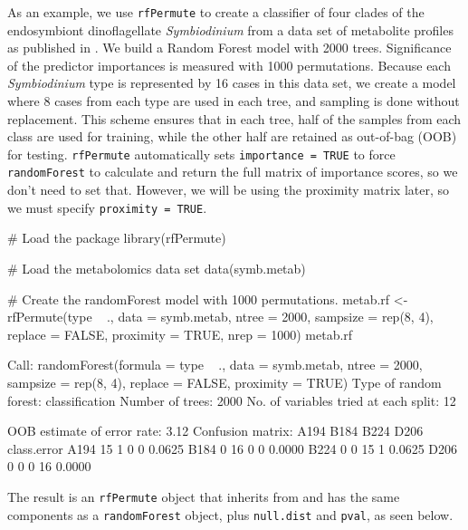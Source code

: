 As an example, we use \texttt{rfPermute} to create a classifier of four
clades of the endosymbiont dinoflagellate \emph{Symbiodinium} from a
data set of metabolite profiles as published in \citet{RN404}. We build
a Random Forest model with 2000 trees. Significance of the predictor
importances is measured with 1000 permutations. Because each
\emph{Symbiodinium} type is represented by 16 cases in this data set, we
create a model where 8 cases from each type are used in each tree, and
sampling is done without replacement. This scheme ensures that in each
tree, half of the samples from each class are used for training, while
the other half are retained as out-of-bag (OOB) for testing.
\texttt{rfPermute} automatically sets \texttt{importance\ =\ TRUE} to
force \texttt{randomForest} to calculate and return the full matrix of
importance scores, so we don't need to set that. However, we will be
using the proximity matrix later, so we must specify
\texttt{proximity\ =\ TRUE}.

\begin{Schunk}
\begin{Sinput}
# Load the package
library(rfPermute)
\end{Sinput}
\end{Schunk}\begin{Schunk}
\begin{Sinput}
# Load the metabolomics data set
data(symb.metab)

# Create the randomForest model with 1000 permutations.
metab.rf <- rfPermute(type ~ ., data = symb.metab, ntree = 2000, sampsize = rep(8, 
    4), replace = FALSE, proximity = TRUE, nrep = 1000)
metab.rf
\end{Sinput}
\begin{Soutput}

Call:
 randomForest(formula = type ~ ., data = symb.metab, ntree = 2000,
   sampsize = rep(8, 4), replace = FALSE, proximity = TRUE) 
               Type of random forest: classification
                     Number of trees: 2000
No. of variables tried at each split: 12

        OOB estimate of  error rate: 3.12%
Confusion matrix:
     A194 B184 B224 D206 class.error
A194   15    1    0    0      0.0625
B184    0   16    0    0      0.0000
B224    0    0   15    1      0.0625
D206    0    0    0   16      0.0000
\end{Soutput}
\end{Schunk}

The result is an \texttt{rfPermute} object that inherits from and has
the same components as a \texttt{randomForest} object, plus
\texttt{null.dist} and \texttt{pval}, as seen below.

